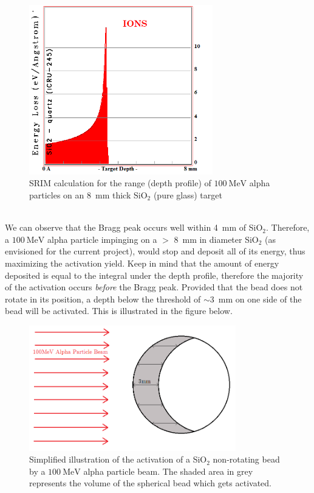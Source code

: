 \documentclass[]{article}
\begin{document}
\begin{figure}[h!]
	\includegraphics[width=8cm]{bb.png}
	\centering
	\captionsetup{justification=centering,margin=2cm}
	\caption{SRIM calculation for the range (depth profile) of $\SI{100}{\mega \electronvolt}$ alpha particles on an \SI{8}{\milli \metre} thick SiO$_2$ (pure glass) target\protect\cite{alphaGlassSimulation}}
	\label{fig:alphaGlassSim}
\end{figure}~\\
We can observe that the Bragg peak occurs well within \SI{4}{\milli \metre} of SiO$_2$. Therefore, a $\SI{100}{\mega \electronvolt}$ alpha particle impinging on a $>$ \SI{8}{\milli \metre} in diameter SiO$_2$ (as envisioned for the current project), would stop and deposit all of its energy, thus maximizing the activation yield. Keep in mind that the amount of energy deposited is equal to the integral under the depth profile, therefore the majority of the activation occurs \textit{before} the Bragg peak. Provided that the bead does not rotate in its position, a depth below the threshold of $\sim$\SI{3}{\milli \metre} on one side of the bead will be activated. This is illustrated in the figure below.
\begin{figure}[h!]
	\includegraphics[width=9cm]{beadRotate.png}
	\centering
	\captionsetup{justification=centering,margin=2cm}
	\caption{Simplified illustration of the activation of a SiO$_2$ non-rotating bead by a $\SI{100}{\mega \electronvolt}$ alpha particle beam. The shaded area in grey represents the volume of the spherical bead which gets activated.}
	\label{fig:glassRotatePaintPIC}
\end{figure}~\\
\end{document}
